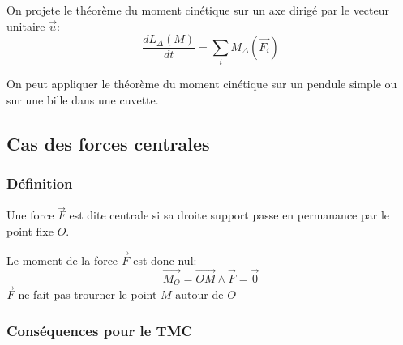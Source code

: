 \begin{theo}
    On projete le théorème du moment cinétique sur un axe dirigé
    par le vecteur unitaire $\vec{u}$:
    \[\frac{dL_{\Delta}(M)}{dt} = \sum_{i} M_{\Delta}(\vec{F_{i}})\]
\end{theo}

\begin{ex}
    On peut appliquer le théorème du moment cinétique sur un pendule simple ou 
    sur une bille dans une cuvette.
\end{ex}


\subsection{Cas des forces centrales}
\subsubsection{Définition}

\begin{defi}
    Une force $\vec{F}$ est dite centrale si sa droite support passe 
    en permanance par le point fixe $O$.
\end{defi}

\begin{cons}
    Le moment de la force $\vec{F}$ est donc nul:
    \[\vec{M_{O}} = \vec{OM} \wedge \vec{F} = \vec{0}\]
    $\vec{F}$ ne fait pas trourner le point $M$ autour de $O$
\end{cons}


\subsubsection{Conséquences pour le TMC}

